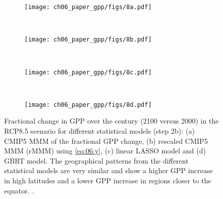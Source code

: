 \begin{figure}[t]
  \centering
  \begin{subfigure}[b]{\SubfigureWidth{}}
    \texttt{[image: ch06\_paper\_gpp/figs/8a.pdf]}
    \caption{}
    \label{fig:06:step2b_results:a}
  \end{subfigure}
  ~
  \begin{subfigure}[b]{\SubfigureWidth{}}
    \texttt{[image: ch06\_paper\_gpp/figs/8b.pdf]}
    \caption{}
    \label{fig:06:step2b_results:b}
  \end{subfigure}
  \\
  \begin{subfigure}[b]{\SubfigureWidth{}}
    \texttt{[image: ch06\_paper\_gpp/figs/8c.pdf]}
    \caption{}
    \label{fig:06:step2b_results:c}
  \end{subfigure}
  ~
  \begin{subfigure}[b]{\SubfigureWidth{}}
    \texttt{[image: ch06\_paper\_gpp/figs/8d.pdf]}
    \caption{}
    \label{fig:06:step2b_results:d}
  \end{subfigure}
  \caption[
    Illustration of our \acl{ML} approach to constrain the fractional change in
    \acf{GPP} over the  century with observations in step 2b.
  ]{
    Fractional change in \acf{GPP} over the  century (2100 versus 2000)
    in the \acs{RCP}8.5 scenario for different statistical models (step 2b):
    (a) \acs{CMIP}5 \acf{MMM} of the fractional \acs{GPP} change, (b) rescaled
    \acs{CMIP}5 \acl{MMM} (r\acs{MMM}) using \cref{eq:06:y}, (c) linear
    \acf{LASSO} model and (d) \acf{GBRT} model. The geographical patterns from
    the different statistical models are very similar and show a higher
    \acs{GPP} increase in high latitudes and a lower \acs{GPP} increase in
    regions closer to the equator. .
  }
  \label{fig:06:step2b_results}
\end{figure}


